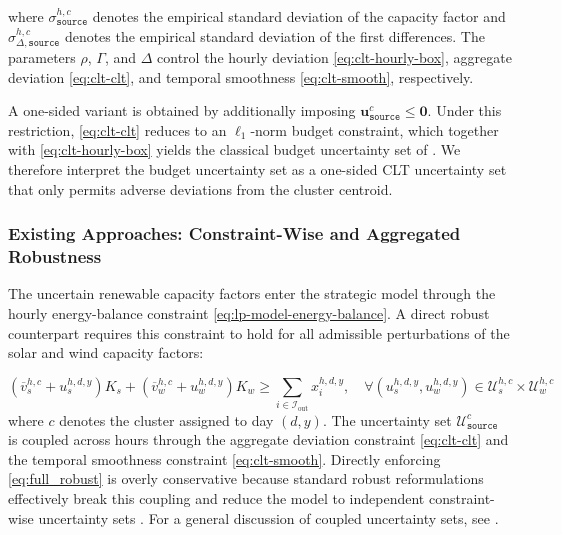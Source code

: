 \documentclass[11pt, letter]{article}
\begin{document}
\noindent
where $\sigma^{h,c}_{\texttt{source}}$ denotes the empirical standard deviation of the capacity factor and $\sigma^{h,c}_{\Delta,\texttt{source}}$ denotes the empirical standard deviation of the first differences. The parameters $\rho$, $\Gamma$, and $\Delta$ control the hourly deviation \eqref{eq:clt-hourly-box}, aggregate deviation \eqref{eq:clt-clt}, and temporal smoothness \eqref{eq:clt-smooth}, respectively.

A one-sided variant is obtained by additionally imposing
$\boldsymbol u^c_{\texttt{source}}\le \boldsymbol 0$.
Under this restriction, \eqref{eq:clt-clt} reduces to an $\ell_1$-norm budget constraint, which together with \eqref{eq:clt-hourly-box} yields the classical budget uncertainty set of \cite{bertsimas_price_2004}. We therefore interpret the budget uncertainty set as a one-sided CLT uncertainty set that only permits adverse deviations from the cluster centroid.
\subsubsection{Existing Approaches: Constraint-Wise and Aggregated Robustness}\label{section:constraintwise-aggregated}
The uncertain renewable capacity factors enter the strategic model through the hourly energy-balance constraint \eqref{eq:lp-model-energy-balance}. A direct robust counterpart requires this constraint to hold for all admissible perturbations of the solar and wind capacity factors:

\begin{equation}\label{eq:full_robust}
     (\overline{v}_s^{h,c} + u_s^{h,d,y}) K_s +  (\overline{v}_w^{h,c} + u_w^{h,d,y}) K_w \ge \sum_{i \in \mathcal{I}_\text{out}} x_{i}^{h,d,y}, \quad \forall (u_s^{h,d,y}, u_w^{h,d,y}) \in \mathcal{U}^{h,c}_s \times \mathcal{U}^{h,c}_w
\end{equation}
where $c$ denotes the cluster assigned to day $(d,y)$. The uncertainty set $\mathcal{U}^c_{\texttt{source}}$ is coupled across hours through the aggregate deviation constraint \eqref{eq:clt-clt} and the temporal smoothness constraint \eqref{eq:clt-smooth}. Directly enforcing \eqref{eq:full_robust} is overly conservative because standard robust reformulations effectively break this coupling and reduce the model to independent constraint-wise uncertainty sets \citep{marandi_when_2018}. For a general discussion of coupled uncertainty sets, see \citet{bertsimas_benefit_2024}.
\end{document}
